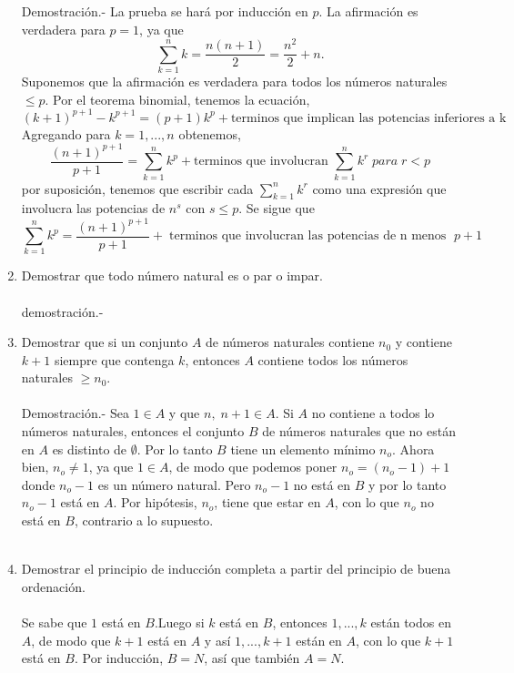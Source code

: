 \begin{enumerate}
Demostración.- \; La prueba se hará por inducción en $p$. La afirmación es verdadera para $p=1$, ya que $$\displaystyle\sum_{k=1}^n k = \dfrac{n(n+1)}{2} = \dfrac{n^2}{2} + n.$$
Suponemos que la afirmación es verdadera para todos los números naturales $\leq p$. Por el teorema binomial, tenemos la ecuación, $$(k+1)^{p+1} - k^{p+1} = (p+1)k^p + \mbox{terminos que implican las potencias inferiores a k}$$
Agregando para $k=1,...,n$ obtenemos,
$$\dfrac{(n+1)^{p+1}}{p+1} = \displaystyle\sum_{k=1}^n k^p + \mbox{terminos que involucran} \; \sum_{k=1}^n k^r \; para \; r<p$$
por suposición, tenemos que escribir cada $\displaystyle\sum_{k=1}^n k^r$ como una expresión que involucra las potencias de $n^s$ con $s\leq p$. Se sigue que $$\displaystyle\sum_{k=1}^n k^p = \dfrac{(n+1)^{p+1}}{p+1} + \; \mbox{terminos que involucran las potencias de n menos } \; p+1$$

\item Demostrar que todo número natural es o par o impar.\\\\
demostración.- \;

\item Demostrar que si un conjunto $A$ de números naturales contiene $n_0$ y contiene $k+1$ siempre que contenga $k$, entonces $A$ contiene todos los números naturales $\geq n_0$.\\\\
Demostración.- \; Sea $1 \in A$ y que $n, \; n+1 \in A$. Si $A$ no contiene a todos lo números naturales, entonces el conjunto $B$ de números naturales que no están en $A$ es distinto de $\emptyset$. Por lo tanto $B$ tiene un elemento mínimo $n_o$. Ahora bien, $n_o \neq 1$, ya que $1 \in A$, de modo que podemos poner $n_o = (n_o -1) + 1$ donde $n_o - 1$ es un número natural. Pero $n_o-1$ no está en $B$ y por lo tanto $n_o -1$ está en $A$. Por hipótesis, $n_o$, tiene que estar en $A$, con lo que $n_o$ no está en $B$, contrario a lo supuesto.\\\\

\item Demostrar el principio de inducción completa a partir del principio de buena ordenación.\\\\
Se sabe que $1$ está en $B$.Luego si $k$ está en $B$, entonces $1,...,k$ están todos en $A$, de modo que $k+1$ está en $A$ y así $1,...,k+1$ están en $A$, con lo que $k+1$ está en $B$. Por inducción, $B=N$, así que también $A=N$.\\\\


\end{enumerate}

